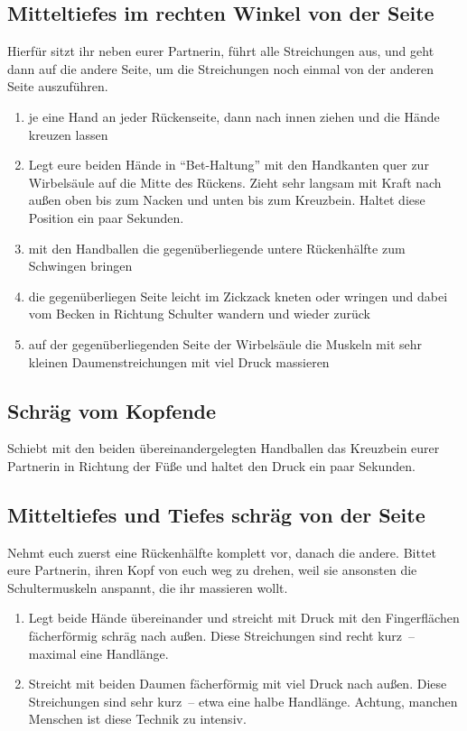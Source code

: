 \subsection{Mitteltiefes im rechten Winkel von der Seite}
Hierfür sitzt ihr neben eurer Partnerin, führt alle Streichungen aus, und geht dann auf die andere Seite, um die Streichungen noch einmal von der anderen Seite auszuführen.

\begin{enumerate}
	\item {} je eine Hand an jeder Rückenseite, dann nach innen ziehen und die Hände kreuzen lassen
	\item {} Legt eure beiden Hände in "`Bet-Haltung"' mit den Handkanten quer zur Wirbelsäule auf die Mitte des Rückens. Zieht sehr langsam mit Kraft nach außen oben bis zum Nacken und unten bis zum Kreuzbein. Haltet diese Position ein paar Sekunden.
	\item {} mit den Handballen die gegenüberliegende untere Rückenhälfte zum Schwingen bringen
	\item {} die gegenüberliegen Seite leicht im Zickzack kneten oder wringen und dabei vom Becken in Richtung Schulter wandern und wieder zurück
	\item {} auf der gegenüberliegenden Seite der Wirbelsäule die Muskeln mit sehr kleinen Daumenstreichungen mit viel Druck massieren
\end{enumerate}


\subsection{Schräg vom Kopfende}
 Schiebt mit den beiden übereinandergelegten Handballen das Kreuzbein eurer Partnerin in Richtung der Füße und haltet den Druck ein paar Sekunden.


\subsection{Mitteltiefes und Tiefes schräg von der Seite}

Nehmt euch zuerst eine Rückenhälfte komplett vor, danach die andere. Bittet eure Partnerin, ihren Kopf von euch weg zu drehen, weil sie ansonsten die Schultermuskeln anspannt, die ihr massieren wollt.

\begin{enumerate}
	\item {} Legt beide Hände übereinander und streicht mit Druck mit den Fingerflächen fächerförmig schräg nach außen. Diese Streichungen sind recht kurz~-- maximal eine Handlänge.
	\item {} Streicht mit beiden Daumen fächerförmig mit viel Druck nach außen. Diese Streichungen sind sehr kurz~-- etwa eine halbe Handlänge. Achtung, manchen Menschen ist diese Technik zu intensiv.
\end{enumerate}

